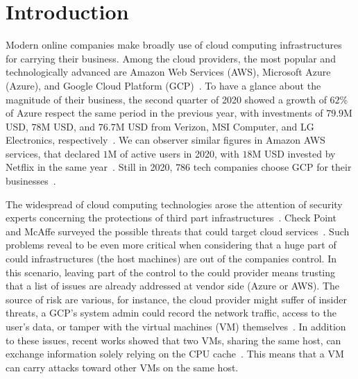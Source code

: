 \chapter{Introduction} %
\label{chp:introduction} 


Modern online companies make broadly use of cloud computing infrastructures for 
carrying their business.
Among the cloud providers, the most popular and technologically advanced 
are Amazon Web Services (AWS), Microsoft Azure (Azure), and Google Cloud 
Platform (GCP)~\citep{flexera_report}.
To have a glance about the magnitude of their business, the second quarter of 
2020 showed a growth of $62$\% of Azure respect the same period in the 
previous year, with investments of $79.9$M USD, $78$M 
USD, and $76.7$M USD from Verizon, MSI Computer, and LG Electronics, 
respectively~\citep{azure_business}.
We can observer similar figures in Amazon AWS services, that declared $1$M of 
active users in 2020, with $18$M USD invested by Netflix in the same 
year~\citep{aws_business}.
Still in 2020, $786$ tech companies choose GCP for their 
businesses~\citep{google_business}.

The widespread of cloud computing technologies arose the attention of security
experts concerning the protections of third part 
infrastructures~\citep{ryan2011cloud,sun2014data}.
Check Point and McAffe surveyed the possible threats that could target
cloud services~\citep{checkpoint_cloud,mcaffee_cloud}.
Such problems reveal to be even more critical when considering that a huge part 
of could infrastructures (\ie the host machines) are out of the companies 
control.
In this scenario, leaving part of the control to the could provider means 
trusting that a list of issues are already addressed at vendor side (\eg Azure 
or AWS).
The source of risk are various, for instance, the cloud provider might suffer 
of insider threats, \eg a GCP's system admin could record the network traffic, 
access to the user's data, or tamper with the 
virtual machines (VM) themselves~\citep{insider_threat}.
In addition to these issues, recent works showed that two VMs, 
sharing the same host, can exchange information solely relying on the CPU 
cache~\citep{maurice2017hello}. This means that a VM can carry attacks 
toward other VMs on the same host.

